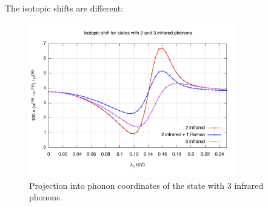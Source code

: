 The isotopic shifts are different:

\begin{figure}[ht!]
\centering
\includegraphics[width=0.8\textwidth]{images/isot-2_3ir.jpg}
\caption{Projection into phonon coordinates of the state with 3 infrared phonons.}
\label{fig:isot-2_3ir}
\end{figure}
